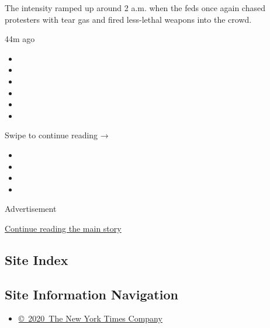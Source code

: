 The intensity ramped up around 2 a.m. when the feds once again chased
protesters with tear gas and fired less-lethal weapons into the crowd.

44m ago

\begin{itemize}
\item
\item
\item
\item
\item
\item
\end{itemize}

Swipe to continue reading →

\begin{itemize}
\item
\item
\item
\item
\end{itemize}

Advertisement

\protect\hyperlink{after-bottom}{Continue reading the main story}

\hypertarget{site-index}{%
\subsection{Site Index}\label{site-index}}

\hypertarget{site-information-navigation}{%
\subsection{Site Information
Navigation}\label{site-information-navigation}}

\begin{itemize}
\tightlist
\item
  \href{https://help.nytimes3xbfgragh.onion/hc/en-us/articles/115014792127-Copyright-notice}{©~2020~The
  New York Times Company}
\end{itemize}

